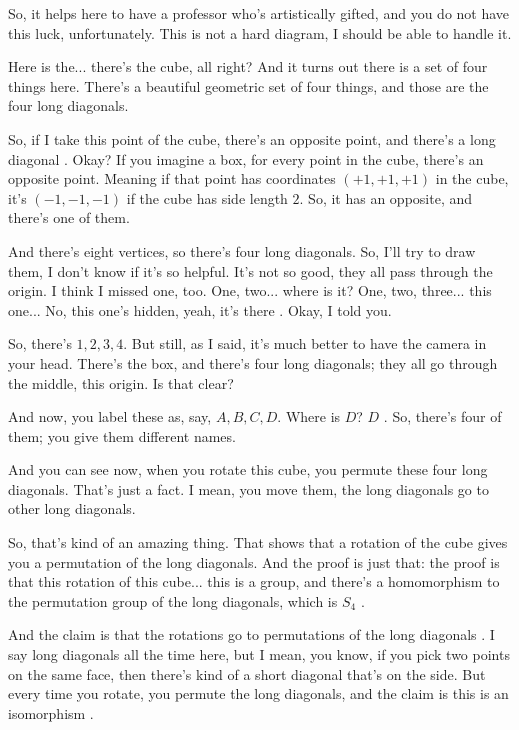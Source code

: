 \begin{speech}[00:38:42 - 00:40:22]
So, it helps here to have a professor who's artistically gifted, and you do not have this luck, unfortunately.  This is not a hard diagram, I should be able to handle it.

Here is the... there's the cube, all right?  And it turns out there is a set of four things here. There's a beautiful geometric set of four things, and those are the four long diagonals.

So, if I take this point of the cube, there's an opposite point, and there's a long diagonal . Okay? If you imagine a box, for every point in the cube, there's an opposite point. Meaning if that point has coordinates $(+1, +1, +1)$ in the cube, it's $(-1, -1, -1)$ if the cube has side length $2$. So, it has an opposite, and there's one of them.

And there's eight vertices, so there's four long diagonals. So, I'll try to draw them, I don't know if it's so helpful. It's not so good, they all pass through the origin. I think I missed one, too. One, two... where is it? One, two, three... this one... No, this one's hidden, yeah, it's there . Okay, I told you.

So, there's $1, 2, 3, 4$. But still, as I said, it's much better to have the camera in your head. There's the box, and there's four long diagonals; they all go through the middle, this origin. Is that clear?
\end{speech}

\begin{speech}[00:40:22 - 00:41:47]
And now, you label these as, say, $A, B, C, D$. Where is $D$? $D$ . So, there's four of them; you give them different names.

And you can see now, when you rotate this cube, you permute these four long diagonals. That's just a fact. I mean, you move them, the long diagonals go to other long diagonals.

So, that's kind of an amazing thing. That shows that a rotation of the cube gives you a permutation of the long diagonals. And the proof is just that: the proof is that this rotation of this cube... this is a group, and there's a homomorphism to the permutation group of the long diagonals, which is $S_4$ .

And the claim is that the rotations go to permutations of the long diagonals . I say long diagonals all the time here, but I mean, you know, if you pick two points on the same face, then there's kind of a short diagonal that's on the side. But every time you rotate, you permute the long diagonals, and the claim is this is an isomorphism .
\end{speech}

